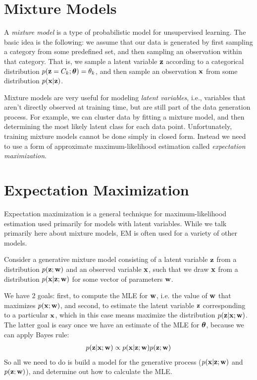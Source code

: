 \documentclass[12pt,letterpaper]{article}
\begin{document}
\section{Mixture Models}

A \emph{mixture model} is a type of probabilistic
model for unsupervised learning. The basic idea is the following:
we assume that our data is generated by 
first sampling a category from some predefined
set, and then sampling an observation within
that category. That is, we sample a latent
variable $\mathbf{z}$ according to a categorical
distribution $p(\mathbf{z} = C_k; \boldsymbol{\theta}) = \theta_k$, and
then sample an observation $\mathbf{x}$ from
some distribution $p(\mathbf{x} | \mathbf{z})$.

\smallskip

Mixture models are very useful for modeling
\emph{latent variables}, i.e., variables that aren't 
directly observed at training time, but are
still part of the data generation process. For 
example, we can cluster data by fitting a mixture
model, and then determining the most likely
latent class for each data point. Unfortunately,
training mixture models cannot be done 
simply in closed form. Instead we need to use
a form of approximate maximum-likelihood estimation
called \emph{expectation maximization}.



\section{Expectation Maximization}
Expectation maximization is a general technique for maximum-likelihood estimation used primarily for models with latent variables. While we talk primarily here about mixture models, EM is often used for a variety of other models.

\smallskip 

Consider a generative mixture model consisting of a latent variable $\mathbf{z}$ from a distribution $p(\mathbf{z}; \mathbf{w})$ and an observed variable $\mathbf{x}$, such that we draw $\mathbf{x}$ from a distribution $p(\mathbf{x} | \mathbf{z}; \mathbf{w})$ for some vector of parameters $\mathbf{w}$. 

\smallskip

We have 2 goals: first, to compute the MLE for $\mathbf{w}$, i.e. the value of $\mathbf{w}$ that maximizes $p(\mathbf{x}; \mathbf{w})$, and second, to estimate the latent variable $\mathbf{z}$ corresponding to a particular $\mathbf{x}$, which in this case means maximize the distribution $p(\mathbf{z} | \mathbf{x}; \mathbf{w})$. The latter goal is easy once we have an estimate of the MLE for $\boldsymbol{\theta}$, because we can apply Bayes rule:
\begin{align}p(\mathbf{z} | \mathbf{x}; \mathbf{w}) \propto p(\mathbf{x} | \mathbf{z}; \mathbf{w})p(\mathbf{z}; \mathbf{w})\end{align}
So all we need to do is build a model for the generative process ($p(\mathbf{x} | \mathbf{z}; \mathbf{w})$ and $p(\mathbf{z}; \mathbf{w})$), and determine out how to calculate the MLE.
\end{document}

